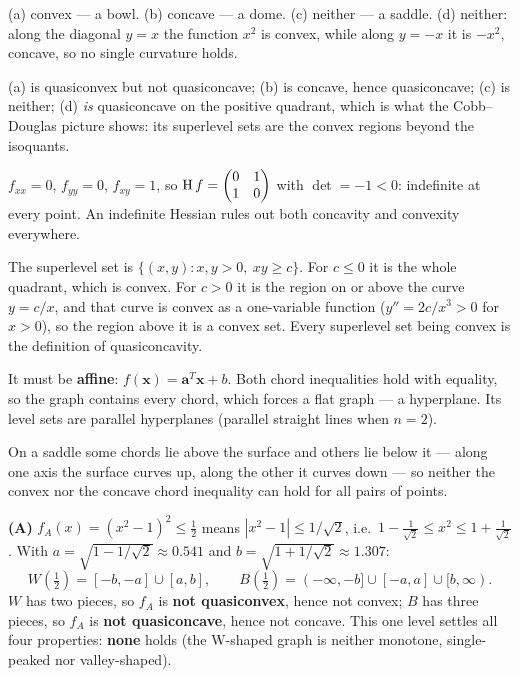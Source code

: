 \begin{solutions}
  \item (a) convex --- a bowl. (b) concave --- a dome. (c) neither --- a
        saddle. (d) neither: along the diagonal $y=x$ the function
        $x^{2}$ is convex, while along $y=-x$ it is $-x^{2}$, concave, so
        no single curvature holds.
  \item (a) is quasiconvex but not quasiconcave; (b) is concave, hence
        quasiconcave; (c) is neither; (d) \emph{is} quasiconcave on the
        positive quadrant, which is what the Cobb--Douglas
        picture shows: its superlevel sets are the convex regions beyond the
        isoquants.
  \item $f_{xx}=0$, $f_{yy}=0$, $f_{xy}=1$, so
        $\operatorname{H} f=\begin{pmatrix}0&1\\1&0\end{pmatrix}$ with
        $\det=-1<0$: indefinite at every point. An indefinite Hessian rules
        out both concavity and convexity everywhere.
  \item The superlevel set is $\{(x,y):x,y>0,\ xy\ge c\}$. For $c\le0$ it is
        the whole quadrant, which is convex. For $c>0$ it is the region on
        or above the curve $y=c/x$, and that curve is convex as a
        one-variable function ($y''=2c/x^{3}>0$ for $x>0$), so the region
        above it is a convex set. Every superlevel set being convex is the
        definition of quasiconcavity.
  \item It must be \textbf{affine}: $f(\mathbf{x})=\mathbf{a}^{T}
        \mathbf{x}+b$. Both chord inequalities hold with equality, so the
        graph contains every chord, which forces a flat graph --- a
        hyperplane. Its level sets are parallel hyperplanes (parallel
        straight lines when $n=2$).
  \item On a saddle some chords lie above the surface and others lie below
        it --- along one axis the surface curves up, along the other it
        curves down --- so neither the convex nor the concave chord
        inequality can hold for all pairs of points.

  \item \textbf{(A)} $f_A(x)=(x^{2}-1)^{2}\le\tfrac12$ means
        $|x^{2}-1|\le1/\sqrt2$, i.e.\
        $1-\tfrac{1}{\sqrt2}\le x^{2}\le1+\tfrac{1}{\sqrt2}$. With
        $a=\sqrt{1-1/\sqrt2}\approx0.541$ and
        $b=\sqrt{1+1/\sqrt2}\approx1.307$:
        \[
          W(\tfrac12)=[-b,-a]\cup[a,b],\qquad
          B(\tfrac12)=(-\infty,-b]\cup[-a,a]\cup[b,\infty).
        \]
        $W$ has two pieces, so $f_A$ is \textbf{not quasiconvex}, hence
        not convex; $B$ has three pieces, so $f_A$ is \textbf{not
        quasiconcave}, hence not concave. This one level settles all four
        properties: \textbf{none} holds (the W-shaped graph is neither
        monotone, single-peaked nor valley-shaped).


\end{solutions}
